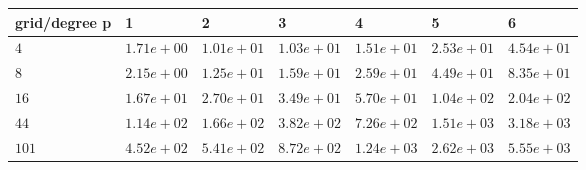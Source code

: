 \begin{tabular}{lllllll}
\hline
 grid/degree p   & 1          & 2          & 3          & 4          & 5          & 6          \\
\hline
 $4$             & $1.71e+00$ & $1.01e+01$ & $1.03e+01$ & $1.51e+01$ & $2.53e+01$ & $4.54e+01$ \\
 $8$             & $2.15e+00$ & $1.25e+01$ & $1.59e+01$ & $2.59e+01$ & $4.49e+01$ & $8.35e+01$ \\
 $16$            & $1.67e+01$ & $2.70e+01$ & $3.49e+01$ & $5.70e+01$ & $1.04e+02$ & $2.04e+02$ \\
 $44$            & $1.14e+02$ & $1.66e+02$ & $3.82e+02$ & $7.26e+02$ & $1.51e+03$ & $3.18e+03$ \\
 $101$           & $4.52e+02$ & $5.41e+02$ & $8.72e+02$ & $1.24e+03$ & $2.62e+03$ & $5.55e+03$ \\
\hline
\end{tabular}